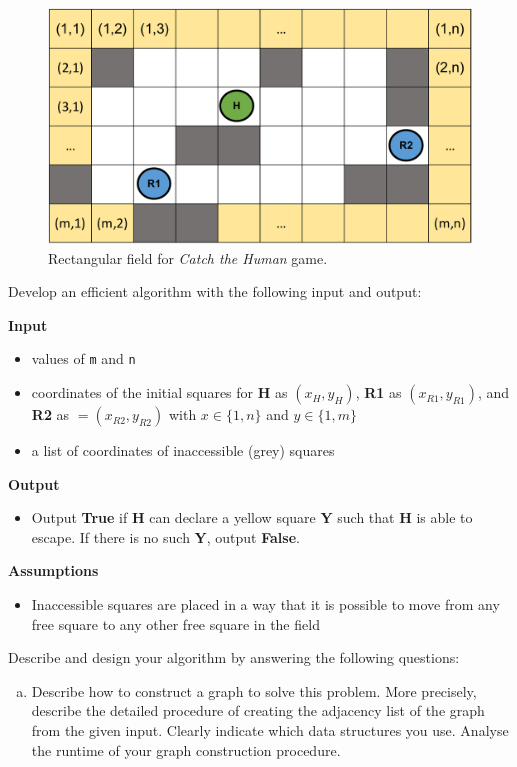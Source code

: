 \documentclass{assignment-263}
\begin{document}
\begin{enumerate}[1.]

  
  \begin{figure}[!h]
  	\centering
  	\includegraphics[width=0.5\columnwidth]{chase_map.pdf}
  	\caption{Rectangular field for \textit{Catch the Human} game.}
  	\label{fig:map}
  \end{figure}
  
  Develop an efficient algorithm with the following input and output:
  
\textbf{Input}
  	\begin{itemize}
  		\item values of \texttt{m} and \texttt{n}
  		\item coordinates of the initial squares for \textbf{H} as $(x_H,y_H)$, \textbf{R1} as $(x_{R1},y_{R1})$, and \textbf{R2} as $=(x_{R2},y_{R2})$ with $x\in\{1,n\}$ and $y\in\{1,m\}$
  		\item a list of coordinates of inaccessible (grey) squares
  	\end{itemize}

\textbf{Output}
\begin{itemize}
\item Output \textbf{True} if \textbf{H} can declare a yellow square
  \textbf{Y} such that \textbf{H} is able to escape.
  If there is no such \textbf{Y}, output \textbf{False}.
\end{itemize}

\textbf{Assumptions}
\begin{itemize}
\item Inaccessible squares are placed in a way that it is possible to move from any free square to any other free square in the field
\end{itemize}

Describe and design your algorithm by answering the following questions:
\begin{enumerate}[(a)]
\item Describe how to construct a graph to solve this problem. 
More precisely, describe the detailed procedure of creating the adjacency list of the graph from the given input. 
Clearly indicate which data structures you use. 
Analyse the runtime of your graph construction procedure.


\end{enumerate}
\end{enumerate}
\end{document}
